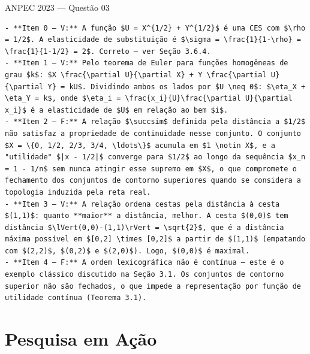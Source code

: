 \documentclass[11pt,twoside,openright]{book}
\begin{document}
\begin{infobox}{ANPEC 2023 — Questão 03}
\begin{verbatim}
- **Item 0 — V:** A função $U = X^{1/2} + Y^{1/2}$ é uma CES com $\rho = 1/2$. A elasticidade de substituição é $\sigma = \frac{1}{1-\rho} = \frac{1}{1-1/2} = 2$. Correto — ver Seção 3.6.4.
- **Item 1 — V:** Pelo teorema de Euler para funções homogêneas de grau $k$: $X \frac{\partial U}{\partial X} + Y \frac{\partial U}{\partial Y} = kU$. Dividindo ambos os lados por $U \neq 0$: $\eta_X + \eta_Y = k$, onde $\eta_i = \frac{x_i}{U}\frac{\partial U}{\partial x_i}$ é a elasticidade de $U$ em relação ao bem $i$.
- **Item 2 — F:** A relação $\succsim$ definida pela distância a $1/2$ não satisfaz a propriedade de continuidade nesse conjunto. O conjunto $X = \{0, 1/2, 2/3, 3/4, \ldots\}$ acumula em $1 \notin X$, e a "utilidade" $|x - 1/2|$ converge para $1/2$ ao longo da sequência $x_n = 1 - 1/n$ sem nunca atingir esse supremo em $X$, o que compromete o fechamento dos conjuntos de contorno superiores quando se considera a topologia induzida pela reta real.
- **Item 3 — V:** A relação ordena cestas pela distância à cesta $(1,1)$: quanto **maior** a distância, melhor. A cesta $(0,0)$ tem distância $\lVert(0,0)-(1,1)\rVert = \sqrt{2}$, que é a distância máxima possível em $[0,2] \times [0,2]$ a partir de $(1,1)$ (empatando com $(2,2)$, $(0,2)$ e $(2,0)$). Logo, $(0,0)$ é maximal.
- **Item 4 — F:** A ordem lexicográfica não é contínua — este é o exemplo clássico discutido na Seção 3.1. Os conjuntos de contorno superior não são fechados, o que impede a representação por função de utilidade contínua (Teorema 3.1).
\end{verbatim}

\end{infobox}

\chapter{Pesquisa em Ação}\label{pesquisa-em-auxe7uxe3o}
\end{document}
